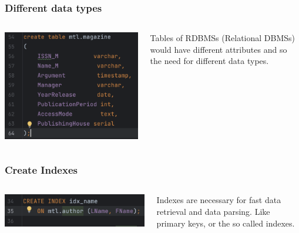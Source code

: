 \documentclass{beamer}
\begin{document}
\begin{frame}
	\frametitle{Different data types}
	\begin{columns}
	\begin{column}{0.4\textwidth}
		\includegraphics[width=\columnwidth]{tablecreation2.png}
	\end{column}
		\begin{column}{0.4\textwidth}
	Tables of RDBMSs (Relational DBMSs) would have different attributes and so the need for different data types.
	\end{column}
		\end{columns}
\end{frame}

\begin{frame}
	\frametitle{Create Indexes}	
	\begin{columns}
	\begin{column}{0.4\textwidth}
		\includegraphics[width=\columnwidth]{indexcreation.png}
	\end{column}
		\begin{column}{0.4\textwidth}
	Indexes are necessary for fast data retrieval and data parsing. Like primary keys, or the so called indexes. 
	\end{column}
	\end{columns}
\end{frame}
\end{document}
